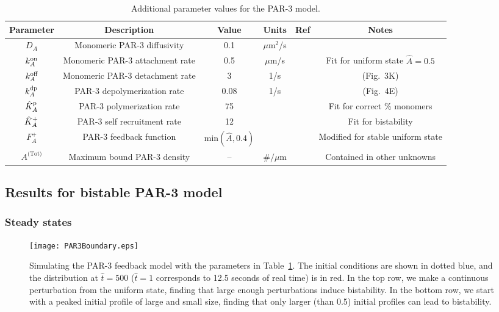 \documentclass[11pt]{article}
\newcommand{\6}[1]{#1_{\text{6}}}
\newcommand{\3}[1]{#1_{\text{3}}}
\newcommand{\Tot}[1]{#1^\text{(Tot)}}
\newcommand{\A}[1]{#1_A}
\begin{document}
\begin{table}
\begin{small}
\centering
\begin{tabular}{|c|c|c|c|c|c|}\hline
Parameter & Description & Value & Units & Ref & Notes \\ \hline
$\A{D} $ & Monomeric PAR-3 diffusivity & 0.1 & $\mu$m$^2$/s & \cite{lang2023oligomerization} & \\
$\A{\kon}$ & Monomeric PAR-3 attachment rate & 0.5 & $\mu$m/s & & Fit for uniform state $\hat A=0.5$ \\
$\A{\koff}$ & Monomeric PAR-3 detachment rate &  3& 1/s & \cite{lang2023oligomerization} & (Fig.\ 3K)\\
$\A{\kdp}$ & PAR-3 depolymerization rate & 0.08 & 1/s & \cite{lang2023oligomerization} & (Fig.\ 4E) \\
$\hat{K}^\text{p}_A$ & PAR-3 polymerization rate & 75 & & & Fit for correct \% monomers \cite{lang2023oligomerization}  \\
$\hat{K}^\text{+}_A$ & PAR-3 self recruitment rate &12 & & & Fit for bistability\\
$F_A^+$ & PAR-3 feedback function &$\text{min}\left(\hat A,0.4\right)$ &  &\cite{lang2022oligomerization} &  Modified for stable uniform state\\
$\Tot{A}$ & Maximum bound PAR-3 density & -- & $\#/\mu$m & & Contained in other unknowns \\ \hline
\end{tabular}
\caption{\label{tab:paramsP3}Additional parameter values for the PAR-3 model. }
\end{small}
\end{table}

\subsection{Results for bistable PAR-3 model}

\subsubsection{Steady states}
\begin{figure}
\centering
\texttt{[image: PAR3Boundary.eps]}
\caption{\label{fig:P3FBBd}Simulating the PAR-3 feedback model with the parameters in Table\ \ref{tab:paramsP3}. The initial conditions are shown in dotted blue, and the distribution at $\hat t = 500$ ($\hat t =1$ corresponds to 12.5 seconds of real time) is in red. In the top row, we make a continuous perturbation from the uniform state, finding that large enough perturbations induce bistability. In the bottom row, we start with a peaked initial profile of large and small size, finding that only larger (than 0.5) initial profiles can lead to bistability.}
\end{figure}
\end{document}
